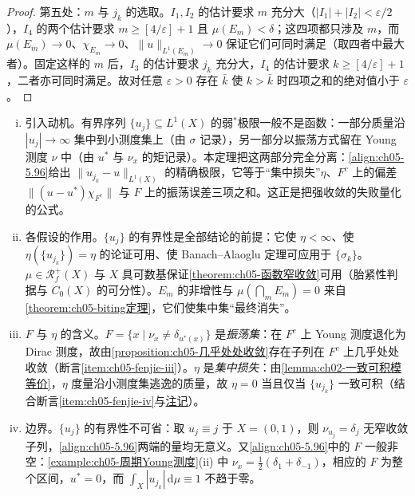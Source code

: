\documentclass[../../main.tex]{subfiles}
\begin{document}
\begin{proof}
第五处：$m$ 与 $j_k$ 的选取。$I_1,I_2$ 的估计要求 $m$ 充分大（$|I_1|+|I_2|<\varepsilon/2$），$I_4$ 的两个估计要求 $m\geqslant[4/\varepsilon]+1$ 且 $\mu(E_m)<\delta$；这四项都只涉及 $m$，而 $\mu(E_m)\to0$、$\chi_{E_m}\to0$、$\|u\|_{L^1(E_m)}\to0$ 保证它们可同时满足（取四者中最大者）。固定这样的 $m$ 后，$I_3$ 的估计要求 $j_k$ 充分大，$I_4$ 的估计要求 $k\geqslant[4/\varepsilon]+1$，二者亦可同时满足。故对任意 $\varepsilon>0$ 存在 $\bar k$ 使 $k>\bar k$ 时四项之和的绝对值小于 $\varepsilon$。
\end{proof}

\begin{remark}\label{remark:ch05-分解注}
\begin{enumerate}[(i)]
\item 引入动机。有界序列 $\{u_j\}\subseteq L^1(X)$ 的弱$^*$极限一般不是函数：一部分质量沿 $|u_j|\to\infty$ 集中到小测度集上（由 $\sigma$ 记录），另一部分以振荡方式留在 Young 测度 $\nu$ 中（由 $u^*$ 与 $\nu_x$ 的矩记录）。本定理把这两部分完全分离：\eqref{align:ch05-5.96}给出 $\|u_{j_k}-u\|_{L^1(X)}$ 的精确极限，它等于“集中损失”$\eta$、$F^c$ 上的偏差 $\|(u-u^*)\chi_{F^c}\|$ 与 $F$ 上的振荡误差三项之和。这正是把强收敛的失败量化的公式。

\item 各假设的作用。$\{u_j\}$ 的有界性是全部结论的前提：它使 $\eta<\infty$、使 $\eta(\{u_{j_k}\})=\eta$ 的论证可用、使 Banach--Alaoglu 定理可应用于 $\{\sigma_k\}$。$\mu\in\mathscr{R}^+_f(X)$ 与 $X$ 具可数基保证\cref{theorem:ch05-函数窄收敛}可用（胎紧性判据与 $C_0(X)$ 的可分性）。$E_m$ 的非增性与 $\mu(\bigcap_mE_m)=0$ 来自\cref{theorem:ch05-biting定理}，它们使集中集“最终消失”。

\item $F$ 与 $\eta$ 的含义。$F=\{x\mid\nu_x\neq\delta_{u^*(x)}\}$ 是\emph{振荡集}：在 $F^c$ 上 Young 测度退化为 Dirac 测度，故由\cref{proposition:ch05-几乎处处收敛}存在子列在 $F^c$ 上几乎处处收敛（断言\cref{item:ch05-fenjie-iii}）。$\eta$ 是\emph{集中损失}：由\cref{lemma:ch02-一致可积模等价}，$\eta$ 度量沿小测度集逃逸的质量，故 $\eta=0$ 当且仅当 $\{u_{j_k}\}$ 一致可积（结合断言\cref{item:ch05-fenjie-iv}与\hyperref[remark:ch02-模零一致可积]{注记}）。

\item 边界。$\{u_j\}$ 的有界性不可省：取 $u_j\equiv j$ 于 $X=(0,1)$，则 $\nu_{u_j}=\delta_j$ 无窄收敛子列，\eqref{align:ch05-5.96}两端的量均无意义。又\eqref{align:ch05-5.96}中的 $F$ 一般非空：\cref{example:ch05-周期Young测度}(ii) 中 $\nu_x=\frac12(\delta_1+\delta_{-1})$，相应的 $F$ 为整个区间，$u^*=0$，而 $\int_X|u_{j_k}|\,\mathrm{d}\mu\equiv1$ 不趋于零。
\end{enumerate}
\end{remark}
\end{document}
